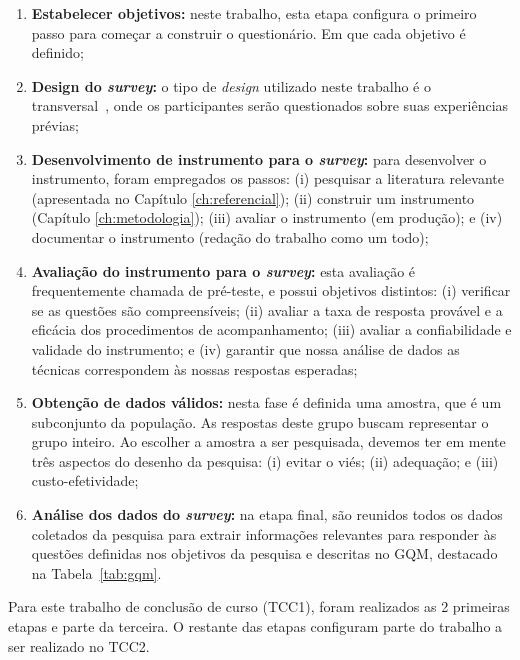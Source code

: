 \begin{enumerate}
\item \textbf{Estabelecer objetivos:} neste trabalho, esta etapa configura o primeiro passo para começar a construir o questionário. Em que cada objetivo é definido;

\item \textbf{Design do \textit{survey}:} o tipo de \textit{design} utilizado neste trabalho é o transversal~\cite{geras2004survey}, onde os participantes serão questionados sobre suas experiências prévias;

\item \textbf{Desenvolvimento de instrumento para o \textit{survey}:} para desenvolver o instrumento, foram empregados os passos: (i) pesquisar a literatura relevante (apresentada no Capítulo \ref{ch:referencial}); (ii) construir um instrumento (Capítulo \ref{ch:metodologia}); (iii) avaliar o instrumento (em produção); e (iv) documentar o instrumento (redação do trabalho como um todo);

\item \textbf{Avaliação do instrumento para o \textit{survey}:} esta avaliação é frequentemente chamada de pré-teste, e possui objetivos distintos: (i) verificar se as questões são compreensíveis; (ii) avaliar a taxa de resposta provável e a eficácia dos procedimentos de acompanhamento; (iii) avaliar a confiabilidade e validade do instrumento; e (iv) garantir que nossa análise de dados as técnicas correspondem às nossas respostas esperadas;

\item \textbf{Obtenção de dados válidos:} nesta fase é definida uma amostra, que é um subconjunto da população. As respostas deste grupo buscam representar o grupo inteiro. Ao escolher a amostra a ser pesquisada, devemos ter em mente três aspectos do desenho da pesquisa: (i) evitar o viés; (ii) adequação; e (iii) custo-efetividade;

\item \textbf{Análise dos dados do \textit{survey}:} na etapa final, são reunidos todos os dados coletados da pesquisa para extrair informações relevantes para responder às questões definidas nos objetivos da pesquisa e descritas no GQM, destacado na Tabela~\ref{tab:gqm}.
\end{enumerate}

Para este trabalho de conclusão de curso (TCC1), foram realizados as 2 primeiras etapas e parte da terceira. O restante das etapas configuram parte do trabalho a ser realizado no TCC2.

